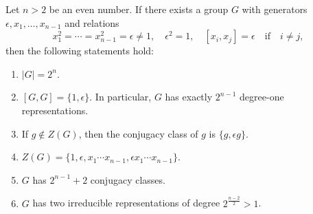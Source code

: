 \begin{lemma}
\label{lem:grupo}
	Let $n>2$ be an even number. If 
	there exists a group $G$ with generators
	$\epsilon,x_1,\dots,x_{n-1}$ and relations 
	\[
		x_1^2=\cdots=x_{n-1}^2=\epsilon\ne1,\quad
		\epsilon^2=1,\quad
		[x_i,x_j]=\epsilon\quad\text{if}\quad i\ne j,
	\]
	then the following statements hold:
	\begin{enumerate}
		\item $|G|=2^n$.
		\item $[G,G]=\{1,\epsilon\}$. In particular, $G$ 
		    has exactly $2^{n-1}$ degree-one representations. 
		\item If $g\not\in Z(G)$, then the conjugacy class of $g$ is $\{g,\epsilon g\}$.
		\item $Z(G)=\{1,\epsilon,x_1\cdots x_{n-1},\epsilon x_1\cdots x_{n-1}\}$. 
		\item $G$ has $2^{n-1}+2$ conjugacy classes.
		\item $G$ has two irreducible representations of degree $2^{\frac{n-2}{2}}>1$. 
	\end{enumerate}
\end{lemma}

